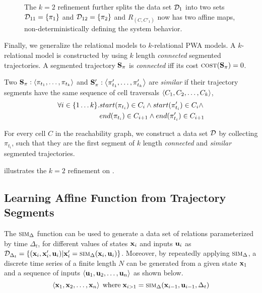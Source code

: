 \begin{figure}[!htbp]
\begin{center}
\begin{tikzpicture}
\end{tikzpicture}
\end{center}
\vspace*{-.3cm}
\caption{The $k=2$ refinement further splits the data set $\ds_1$
    into two sets $\ds_{11} = \setof{\pi_1}$ and $\ds_{12} =
    \setof{\pi_2}$ and $R_{(C,C'_1)}$ now has two affine maps,
    non-deterministically defining the system behavior.}
\label{fig:k2}
\vspace*{-.3cm}
\end{figure}

Finally, we generalize the relational models to $k$-relational PWA
models. A $k$-relational model is constructed by using $k$ length
\textit{connected} segmented trajectories. A segmented trajectory $\SegTraj$ is
\textit{connected} iff its cost $\cost(\SegTraj) = 0$.

Two $\SegTraj:\tupleof{\pi_{t_1}, \ldots, \pi_{t_k}}$ and
$\SegTraj':\tupleof{\pi'_{t_1}, \ldots, \pi'_{t_k}}$ are
\textit{similar} if their trajectory segments have the same sequence
of cell traversals $\tupleof{C_1, C_2, \ldots, C_k}$, \ie
\begin{align*}
    \forall i\in\setof{1 \ldots k}.
    & start(\pi_{t_i}) \in C_i          
    \land start(\pi'_{t_i}) \in C_i \land  \\
    & end(\pi_{t_i}) \in C_{i+1}  
    \land end(\pi'_{t_i}) \in C_{i+1}
\end{align*}

For every cell $C$ in the reachability graph, we construct a data set
$\ds$ by collecting $\pi_{t_i}$, such that they are the first segment of $k$
length \textit{connected} and \textit{similar} segmented trajectories.

 illustrates the $k=2$ refinement on .

\subsection{Learning Affine Function from Trajectory Segments}

The $\simulate$ function can be used to generate a data set of
relations parameterized by time $\Delta_t$, for different values of
states $\x_i$ and inputs $\vu_i$ as $\ds_{\Delta_t} =
\setof{(\x_i,\x'_i,\vu_i) | \x'_i = \simulate(\x_i,\vu_i)}$.
Moreover, by repeatedly applying $\simulate$, a discrete time series
of a finite length $N$ can be generated from a given state $\x_1$
and a sequence of inputs $\tupleof{\vu_1, \vu_2,\ldots,\vu_n}$ as shown
below.
\[\tupleof{\x_1, \x_2, \ldots, \x_n} \;\text{where}\; \x_{i>1} =
\simulate(\x_{i-1}, \vu_{i-1}, \Delta_t)\]

